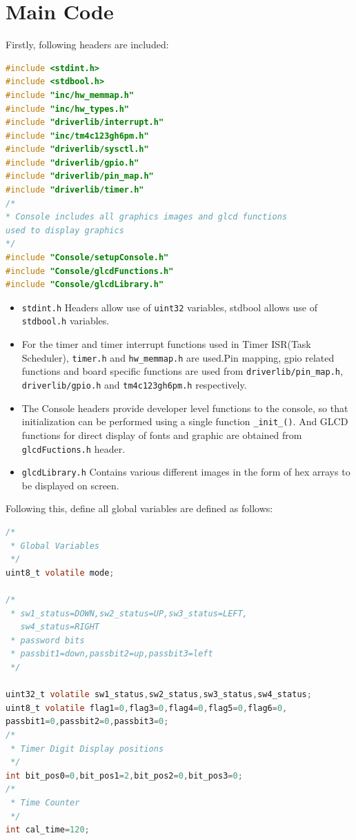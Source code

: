\documentclass{article}
\begin{document}
\section{Main Code}
\qquad Firstly, following headers are included:
  \begin{lstlisting}[basicstyle = \small, language = C]
#include <stdint.h>
#include <stdbool.h>
#include "inc/hw_memmap.h"
#include "inc/hw_types.h"
#include "driverlib/interrupt.h"
#include "inc/tm4c123gh6pm.h"
#include "driverlib/sysctl.h"
#include "driverlib/gpio.h"
#include "driverlib/pin_map.h"
#include "driverlib/timer.h"
/*
* Console includes all graphics images and glcd functions
used to display graphics
*/
#include "Console/setupConsole.h"
#include "Console/glcdFunctions.h"
#include "Console/glcdLibrary.h"
  \end{lstlisting}
\begin{itemize}
  \item \texttt{stdint.h} Headers allow use of \texttt{uint32} variables, stdbool allows use of \texttt{stdbool.h} variables.
  \item For the timer and timer interrupt functions used in Timer ISR(Task Scheduler), \texttt{timer.h} and \texttt{hw\_memmap.h} are used.Pin mapping, gpio related functions and board specific functions are used from \texttt{driverlib/pin\_map.h},\\  \texttt{driverlib/gpio.h} and \texttt{tm4c123gh6pm.h} respectively.
  \item The Console headers provide developer level functions to the console, so that initialization can be performed using a single function \texttt{\_init\_()}. And GLCD functions for direct display of fonts and graphic are obtained from \texttt{glcdFuctions.h} header.

  \item \texttt{glcdLibrary.h} Contains various different images in the form of hex arrays to be displayed on screen.
\end{itemize}
\newpage
\qquad Following this, define all global variables are defined as follows:
  \begin{lstlisting}[basicstyle = \small, language = C]
/*
 * Global Variables
 */
uint8_t volatile mode;

/*
 * sw1_status=DOWN,sw2_status=UP,sw3_status=LEFT,
   sw4_status=RIGHT
 * password bits
 * passbit1=down,passbit2=up,passbit3=left
 */

uint32_t volatile sw1_status,sw2_status,sw3_status,sw4_status;
uint8_t volatile flag1=0,flag3=0,flag4=0,flag5=0,flag6=0,
passbit1=0,passbit2=0,passbit3=0;
/*
 * Timer Digit Display positions
 */
int bit_pos0=0,bit_pos1=2,bit_pos2=0,bit_pos3=0;
/*
 * Time Counter
 */
int cal_time=120;
  \end{lstlisting}
\end{document}

